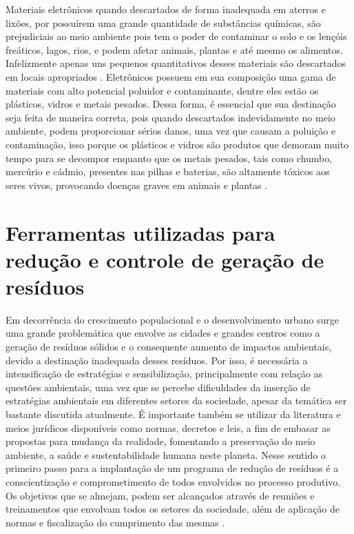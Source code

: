 \documentclass[
	12pt,				%
	openany,			%
	twoside,			%
	a4paper,			%
	english,			%
	french,				%
	spanish,			%
	brazil				%
	]{abntex2}
\begin{document}
Materiais eletrônicos quando descartados de forma inadequada em aterros e lixões, por possuírem uma grande quantidade de substâncias químicas, são prejudiciais ao meio ambiente pois tem o poder de contaminar o solo e os lençóis freáticos, lagos, rios, e podem afetar animais, plantas e até mesmo os alimentos. Infelizmente apenas uns pequenos quantitativos desses materiais são descartados em locais apropriados \cite{cn}. 
Eletrônicos possuem em sua composição uma gama de materiais com alto potencial poluidor e contaminante, dentre eles estão os plásticos, vidros e metais pesados. Dessa forma, é essencial que sua destinação seja feita de maneira correta, pois quando descartados indevidamente no meio ambiente, podem proporcionar sérios danos, uma vez que causam a poluição e contaminação, isso porque os plásticos e vidros são produtos que demoram muito tempo para se decompor enquanto que os metais pesados, tais como chumbo, mercúrio e cádmio, presentes nas pilhas e baterias, são altamente tóxicos aos seres vivos, provocando doenças graves em animais e plantas \cite{aftc}.


\section{Ferramentas utilizadas para redução e controle de geração de resíduos}
Em decorrência do crescimento populacional e o desenvolvimento urbano surge uma grande problemática que envolve as cidades e grandes centros como a geração de resíduos sólidos e o consequente aumento de impactos ambientais, devido a destinação inadequada desses resíduos. 
Por isso, é necessária a intensificação de estratégias e sensibilização, principalmente com relação as questões ambientais, uma vez que se percebe dificuldades da inserção de estratégias ambientais em diferentes setores da sociedade, apesar da temática ser bastante discutida atualmente. É importante também se utilizar da literatura e meios jurídicos disponíveis como normas, decretos e leis, a fim de embasar as propostas para mudança da realidade, fomentando a preservação do meio ambiente, a saúde e sustentabilidade humana neste planeta.
Nesse sentido o primeiro passo para a implantação de um programa de redução de resíduos é a conscientização e comprometimento de todos envolvidos no processo produtivo. Os objetivos que se almejam, podem ser alcançados através de reuniões e treinamentos que envolvam todos os setores da sociedade, além de aplicação de normas e fiscalização do cumprimento das mesmas \cite{rsgsieskvs}.
\end{document}
